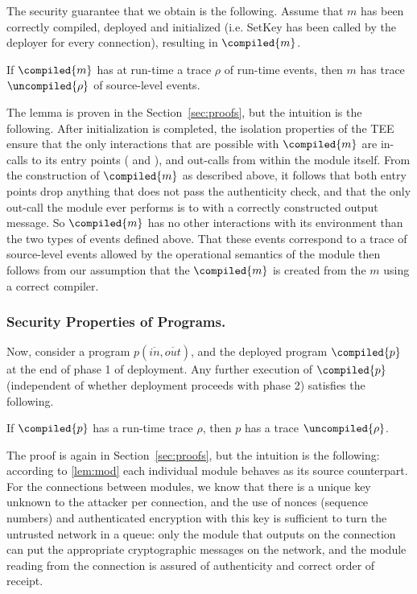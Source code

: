 The security guarantee that we obtain is the following. Assume that $m$ has been correctly compiled, deployed and initialized (i.e. SetKey has been called by the deployer for
every connection), resulting in $\compiled{m}$.
%
\begin{lemma} \label{lem:mod}
If $\compiled{m}$ has at run-time a trace $\rho$ of run-time events, then $m$ has trace $\uncompiled{\rho}$ of source-level events.
\end{lemma}
%
The lemma is proven in the Section~\ref{sec:proofs}, but the intuition is the following.
After initialization is completed, the isolation properties of the TEE ensure that the only
interactions that are possible with $\compiled{m}$ are in-calls to its entry points (\handleinput{} and \setkey), and out-calls from within the module itself. From the construction of $\compiled{m}$ as described above, it follows that both entry points drop anything that does not pass the authenticity check,
and that the only out-call the module ever performs is to \handlelocalevent{} with a correctly constructed output message.
So $\compiled{m}$ has no other interactions with its environment than the two types of events defined above.
That these events correspond to a trace of source-level events allowed by the operational semantics of the module then follows from our assumption that the $\compiled{m}$ is created from the $m$ using a correct compiler.

\subsubsection{Security Properties of Programs.}
\label{formal-security-properties}
%
Now, consider a program $p(\overline{in},\overline{out})$, and the deployed program $\compiled{p}$ at the end of phase 1 of deployment.
Any further execution of $\compiled{p}$ (independent of whether deployment proceeds with phase 2) satisfies the following.
%
\begin{lemma}\label{lem:prog}
If $\compiled{p}$ has a run-time trace $\rho$, then $p$ has a trace $\uncompiled{\rho}$.
\end{lemma}
%
The proof is again in Section~\ref{sec:proofs}, but the intuition is the following: according to \cref{lem:mod} each individual module behaves as its source counterpart. For the
connections between modules, we know that there is a unique key unknown to the attacker per connection, and the use of nonces (sequence numbers) and authenticated encryption
with this key is sufficient to turn the untrusted network in a queue: only the module that outputs on the connection can put the appropriate cryptographic messages on the 
network, and the module reading from the connection is assured of authenticity and correct order of receipt.

